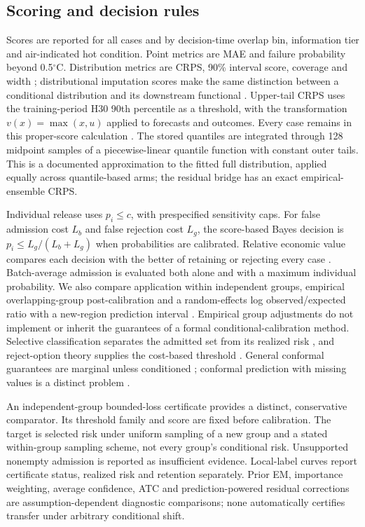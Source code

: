 \documentclass[draft,linenumbers]{agujournal2025}
\begin{document}
\subsection{Scoring and decision rules}
Scores are reported for all cases and by decision-time overlap bin, information tier and air-indicated hot condition. Point metrics are MAE and failure probability beyond 0.5$^{\circ}$C. Distribution metrics are CRPS, 90\% interval score, coverage and width \cite{gneiting2007,romano2019}; distributional imputation scores make the same distinction between a conditional distribution and its downstream functional \cite{naf2023}. Upper-tail CRPS uses the training-period H30 90th percentile as a threshold, with the transformation $v(x)=\max(x,u)$ applied to forecasts and outcomes. Every case remains in this proper-score calculation \cite{gneiting2011weighted,lerch2017}. The stored quantiles are integrated through 128 midpoint samples of a piecewise-linear quantile function with constant outer tails. This is a documented approximation to the fitted full distribution, applied equally across quantile-based arms; the residual bridge has an exact empirical-ensemble CRPS.

Individual release uses $p_i\leq c$, with prespecified sensitivity caps. For false admission cost $L_b$ and false rejection cost $L_g$, the score-based Bayes decision is $p_i\leq L_g/(L_b+L_g)$ when probabilities are calibrated. Relative economic value compares each decision with the better of retaining or rejecting every case \cite{richardson2000}. Batch-average admission is evaluated both alone and with a maximum individual probability. We also compare application within independent groups, empirical overlapping-group post-calibration and a random-effects log observed/expected ratio with a new-region prediction interval \cite{riley2016}. Empirical group adjustments do not implement or inherit the guarantees of a formal conditional-calibration method. Selective classification separates the admitted set from its realized risk \cite{geifman2017,traub2024}, and reject-option theory supplies the cost-based threshold \cite{chow1970,franc2023}. General conformal guarantees are marginal unless conditioned \cite{vovk2005,tibshirani2019,dunn2023}; conformal prediction with missing values is a distinct problem \cite{zaffran2023}.

An independent-group bounded-loss certificate provides a distinct, conservative comparator. Its threshold family and score are fixed before calibration. The target is selected risk under uniform sampling of a new group and a stated within-group sampling scheme, not every group's conditional risk. Unsupported nonempty admission is reported as insufficient evidence. Local-label curves report certificate status, realized risk and retention separately. Prior EM, importance weighting, average confidence, ATC and prediction-powered residual corrections are assumption-dependent diagnostic comparisons; none automatically certifies transfer under arbitrary conditional shift.
\end{document}
